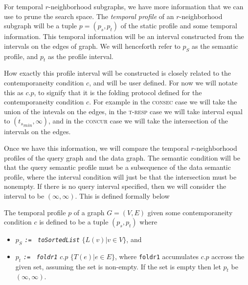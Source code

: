 For temporal $r$-neighborhood subgraphs, we have more information that we can
use to prune the search space. The \textit{temporal profile} of an
$r$-neighborhood subgraph will be a tuple $p = (p_s,p_t)$ of the static profile and
some temporal information. This temporal information will be an interval
constructed from the intervals on the edges of graph. We will henceforth refer
to $p_S$ as the semantic profile, and $p_t$ as the profile interval.

How exactly this profile interval will be constructed is closely related to the
contemporaneity condition $c$, and will be user defined.  For now we will notate
this as $c.p$, to signify that it is the folding protocol defined for the
contemporaneity condition $c$. For example in the \textsc{consec} case we will
take the union of the intevals on the edges, in the \textsc{t-resp} case we will
take interval equal to $({t_s}_{min}, \infty)$, and in the \textsc{concur} case
we will take the intersection of the intervals on the edges.

Once we have this information, we will compare the temporal $r$-neighborhood
profiles of the query graph and the data graph. The semantic condition will be
that the query semantic profile must be a subsequence of the data semantic
profile, where the interval condition will just be that the intersection must be
nonempty.  If there is no query interval specified, then we will consider the
interval to be $(\infty, \infty)$. This is defined formally below

\begin{defn}
  The temporal profile $p$ of a graph $G = (V,E)$ given some contemporaneity condition
  $c$ is defined to be a tuple $(p_s, p_t)$ where
  \begin{itemize}
  \item $p_S$ \emph{\texttt{:=} \, \texttt{toSortedList}} \; $\{L(v) | v \in V \}$,
    and
  \item $p_t$ \emph{\texttt{:=} \, \texttt{foldr1}} \; $c.p$ \; $\{T(e) | e \in E\}$, where
    \texttt{foldr1} accumulates $c.p$ accross the  given set, assuming the set
    is non-empty. If the set is empty then let $p_t$ be $(\infty,\infty)$.
  \end{itemize}
\end{defn}

